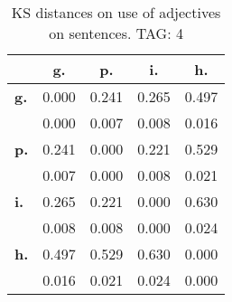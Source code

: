 \begin{table}[h!]
\begin{center}
\begin{tabular}{| l || c | c | c | c |}\hline
 & {\bf g.} & {\bf p.} & {\bf i.} & {\bf h.} \\\hline\hline
{\bf g.} & 0.000 & 0.241 & 0.265 & 0.497 \\
{\bf } & 0.000 & 0.007 & 0.008 & 0.016 \\\hline
{\bf p.} & 0.241 & 0.000 & 0.221 & 0.529 \\
{\bf } & 0.007 & 0.000 & 0.008 & 0.021 \\\hline
{\bf i.} & 0.265 & 0.221 & 0.000 & 0.630 \\
{\bf } & 0.008 & 0.008 & 0.000 & 0.024 \\\hline
{\bf h.} & 0.497 & 0.529 & 0.630 & 0.000 \\
{\bf } & 0.016 & 0.021 & 0.024 & 0.000 \\\hline
\end{tabular}
\caption{KS distances on use of adjectives on sentences. TAG: 4}
\end{center}
\end{table}